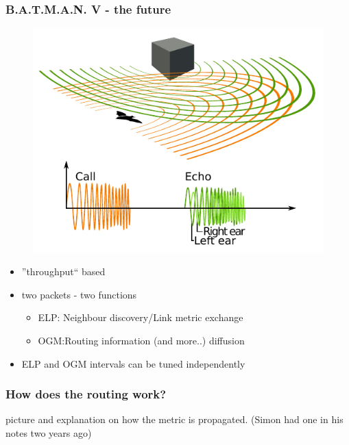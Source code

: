\documentclass[slidestop]{beamer}
\begin{document}
\begin{frame}[c]
	\frametitle{B.A.T.M.A.N. V - the future}
	\begin{figure}
		\centering
		\includegraphics[scale=0.5]{ext_images/Animal_echolocation.pdf}
	\end{figure}

	\begin{itemize}
		\item ''throughput`` based
		\item two packets - two functions
			\begin{itemize}
				\item ELP: Neighbour discovery/Link metric
					exchange
				\item OGM:Routing information (and more..) diffusion
			\end{itemize}
		\item ELP and OGM intervals can be tuned independently
	\end{itemize}
	\begin{figure}
		\centering
	\end{figure}
\end{frame}

\begin{frame}[c]
	\frametitle{How does the routing work?}
	picture and explanation on how the metric is propagated. (Simon had one
	in his notes two years ago)
\end{frame}
\end{document}
